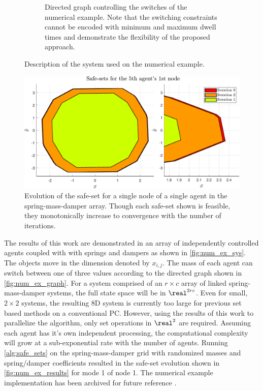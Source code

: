 \begin{figure}
\begin{subfigure}[c]{0.475\columnwidth}
		\caption{Directed graph controlling the switches of the numerical example. Note that the switching constraints cannot be encoded with minimum and maximum dwell times and demonstrate the flexibility of the proposed approach.}%
		\label{fig:num_ex_graph}%
	\end{subfigure}%
	\caption{Description of the system used on the numerical example.}%
\end{figure}

\begin{figure}[t]
\centering
\includegraphics[width=\columnwidth]{./figures/num_ex_results}
\caption{Evolution of the safe-set for a single node of a single agent in the spring-mass-damper array. Though each safe-set shown is feasible, they monotonically increase to convergence with the number of iterations.}
\label{fig:num_ex_results}
\end{figure}

The results of this work are demonstrated in an array of independently controlled agents coupled with with springs and dampers as shown in \autoref{fig:num_ex_sys}. The objects move in the dimension denoted by $x_{i,j}$. The mass of each agent can switch between one of three values according to the directed graph shown in \autoref{fig:num_ex_graph}. For a system comprised of an $r\times c$ array of linked spring-mass-damper systems, the full state space will be in $\real^{2rc}$. Even for small, $2\times 2$ systems, the resulting 8D system is currently too large for previous set based methods on a conventional PC. However, using the results of this work to parallelize the algorithm, only set operations in $\real^2$ are required. Assuming each agent has it's own independent processing, the computational complexity will grow at a sub-exponential rate with the number of agents. Running \autoref{alg:safe_sets} on the spring-mass-damper grid with randomized masses and spring/damper coefficients resulted in the safe-set evolution shown in \autoref{fig:num_ex_results} for mode 1 of node 1. The numerical example implementation has been archived for future reference \cite{PaperSoftware}. 